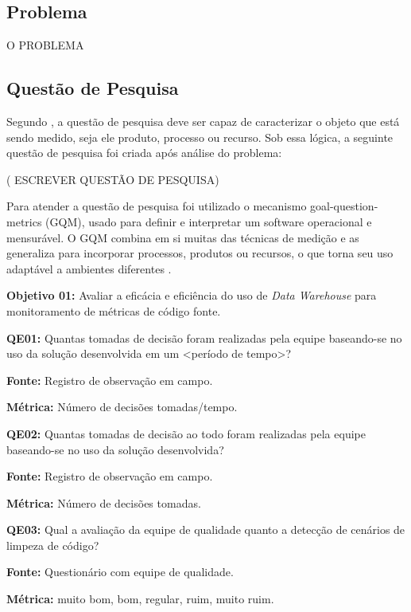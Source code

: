 \subsection{Problema}

O PROBLEMA


\subsection{Questão de Pesquisa}

Segundo , a questão de pesquisa deve ser capaz de caracterizar o objeto que está sendo medido, seja ele produto, processo ou recurso. Sob essa lógica, a seguinte questão de pesquisa foi criada após análise do problema:

( ESCREVER QUESTÃO DE PESQUISA)

Para atender a questão de pesquisa foi utilizado o mecanismo goal-question-metrics (GQM), usado para definir e interpretar um software operacional e mensurável. O GQM combina em si muitas das técnicas de medição e as generaliza para incorporar processos, produtos ou recursos, o que torna seu uso adaptável a ambientes diferentes \cite{caldiera_goal_1994}. 


\textbf{Objetivo 01:} Avaliar a eficácia e eficiência do uso de \textit{Data Warehouse} para monitoramento de métricas de código fonte.


\textbf{QE01:} Quantas tomadas de decisão foram realizadas pela equipe baseando-se no uso da solução desenvolvida em um <período de tempo>?

\textbf{Fonte:} Registro de observação em campo.

\textbf{Métrica:} Número de decisões tomadas/tempo.


\textbf{QE02: } Quantas tomadas de decisão ao todo foram realizadas pela equipe baseando-se no uso da solução desenvolvida?

\textbf{Fonte:} Registro de observação em campo.

\textbf{Métrica:} Número de decisões tomadas.


\textbf{QE03: } Qual a avaliação da equipe de qualidade quanto a detecção de cenários de limpeza de código?

\textbf{Fonte:} Questionário com equipe de qualidade.

\textbf{Métrica:} muito bom, bom, regular, ruim, muito ruim.

